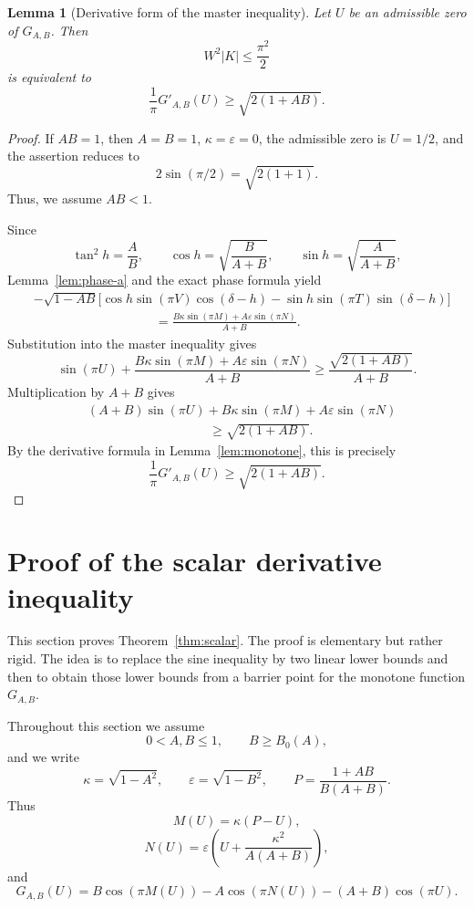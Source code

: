 \documentclass[11pt]{amsart}
\newtheorem{lemma}[theorem]{Lemma}
\theoremstyle{remark}
\newcommand{\eps}{\varepsilon}
\numberwithin{equation}{section}
\begin{document}
\begin{lemma}[Derivative form of the master inequality]\label{lem:derivative-master}
Let $U$ be an admissible zero of $G_{A,B}$. Then
\[
        W^2|K|\leq \frac{\pi^2}{2}
\]
is equivalent to
\[
        \frac1\pi G'_{A,B}(U)\geq \sqrt{2(1+AB)}.
\]
\end{lemma}

\begin{proof}
If $AB=1$, then $A=B=1$, $\kappa=\eps=0$, the admissible zero is $U=1/2$, and the assertion reduces to
\[
        2\sin(\pi/2)=\sqrt{2(1+1)}.
\]
Thus, we assume $AB<1$.

Since
\[
        \tan^2 h=\frac AB,
        \qquad
        \cos h=\sqrt{\frac B{A+B}},
        \qquad
        \sin h=\sqrt{\frac A{A+B}},
\]
Lemma~\ref{lem:phase-a} and the exact phase formula yield
\[
\begin{aligned}
&-\sqrt{1-AB}\bigl[
        \cos h\sin(\pi V)\cos(\delta-h)
        -\sin h\sin(\pi T)\sin(\delta-h)
        \bigr]             \\
&\hspace{4cm}=
        \frac{B\kappa\sin(\pi M)+A\eps\sin(\pi N)}{A+B}.
\end{aligned}
\]
Substitution into the master inequality gives
\[
        \sin(\pi U)
        +\frac{B\kappa\sin(\pi M)+A\eps\sin(\pi N)}{A+B}
        \geq
        \frac{\sqrt{2(1+AB)}}{A+B}.
\]
Multiplication by $A+B$ gives
\[
\begin{aligned}
 &(A+B)\sin(\pi U)
        +B\kappa\sin(\pi M)
        +A\eps\sin(\pi N)      \\
 &\hspace{4cm}\geq \sqrt{2(1+AB)}.
\end{aligned}
\]
By the derivative formula in Lemma~\ref{lem:monotone}, this is precisely
\[
        \frac1\pi G'_{A,B}(U)\geq \sqrt{2(1+AB)}.
\]
\end{proof}

\section{Proof of the scalar derivative inequality}\label{sec:scalar-proof}

This section proves Theorem~\ref{thm:scalar}.  The proof is elementary but rather rigid.  The idea is to replace the sine inequality by two linear lower bounds and then to obtain those lower bounds from a barrier point for the monotone function $G_{A,B}$.

Throughout this section we assume
\[
        0<A,B\leq 1,
        \qquad
        B\geq B_0(A),
\]
and we write
\[
        \kappa=\sqrt{1-A^2},
        \qquad
        \eps=\sqrt{1-B^2},
        \qquad
        P=\frac{1+AB}{B(A+B)}.
\]
Thus
\[
        M(U)=\kappa(P-U),
\]
\[
        N(U)=\eps\left(U+\frac{\kappa^2}{A(A+B)}\right),
\]
and
\[
        G_{A,B}(U)=B\cos(\pi M(U))-A\cos(\pi N(U))-(A+B)\cos(\pi U).
\]
\end{document}
